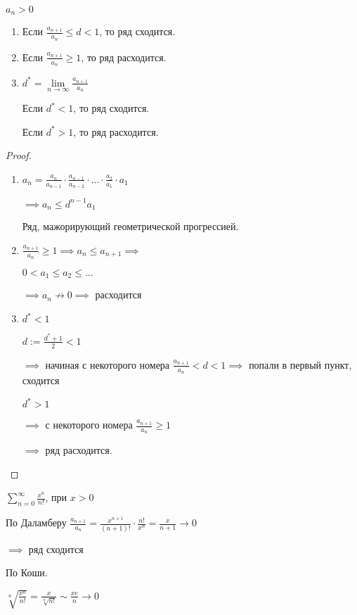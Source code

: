 
\begin{theorem}\slashns
	
	$a_n > 0$
	
	\begin{enumerate}
		\item Если $\frac{a_{n+1}}{a_n} \le d < 1$, то ряд сходится.
		\item Если $\frac{a_{n+1}}{a_n} \ge 1$, то ряд расходится.
		\item $d^* = \lim\limits_{n \to \infty} \frac{a_{n+1}}{a_n}$
		
		Если $d^* < 1$, то ряд сходится.
		
		Если $d^* > 1$, то ряд расходится.
		
	\end{enumerate}
\end{theorem}

\begin{proof}\slashns
	
	\begin{enumerate}
		\item $a_n = \frac{a_n}{a_{n-1}} \cdot \frac{a_{n-1}}{a_{n-2}}\cdot ... \cdot \frac{a_2}{a_1} \cdot a_1$
		
		$\implies a_n \le d^{n-1}a_1$
		
		Ряд, мажорирующий геометрической прогрессией.
		
		\item $\frac{a_{n+1}}{a_n} \ge 1 \implies a_n \le a_{n+1} \implies$ 
		
		$0 < a_1 \le a_2 \le ...$
		
		$\implies a_n \not\to 0 \implies$ расходится
		
		\item $d^* < 1$
		
		$d:= \frac{d^*+1}{2} < 1$
		
		$\implies$ начиная с некоторого номера $\frac{a_{n+1}}{a_n} < d < 1 \implies$ попали в первый пункт, сходится
		
		$d^* > 1$
		
		$\implies$ с некоторого номера $\frac{a_{n+1}}{a_n} \ge 1$
		
		$\implies$ ряд расходится. 
	\end{enumerate}
\end{proof}

\begin{example}\slashns
	
	$\sum\limits_{n = 0}^{\infty} \frac{x^n}{n!}$, при $x > 0$
	
	По Даламберу $\frac{a_{n+1}}{a_n} = \frac{x^{n+1}}{(n+1)!} \cdot \frac{n!}{x^n} = \frac{x}{n+1} \to 0$
	
	$\implies $ ряд сходится
	
	По Коши.
	
	$\sqrt[n]{\frac{x^n}{n!}} = \frac{x}{\sqrt[n]{n!}} \sim \frac{xe}{n} \to 0$
\end{example}

